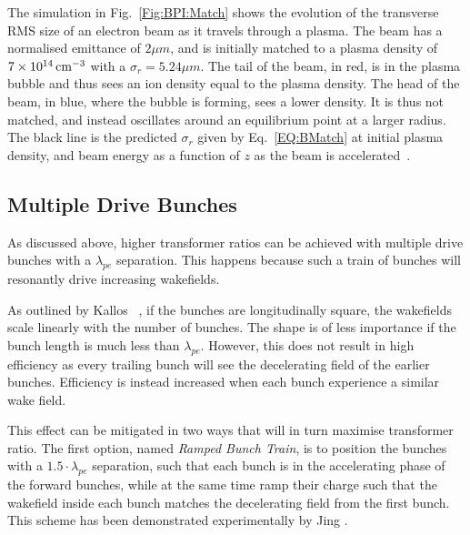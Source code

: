 The simulation in Fig.~\ref{Fig:BPI:Match} shows the evolution of the transverse RMS size of an electron beam as it travels through a plasma.
The beam has a normalised emittance of $2\unit{\mu m}$, and is initially matched to a plasma density of $7\times 10^{14}\,\mathrm{cm}^{-3}$ with a $\sigma_{r} = 5.24\unit{\mu m}$.
The tail of the beam, in red, is in the plasma bubble and thus sees an ion density equal to the plasma density.
The head of the beam, in blue, where the bubble is forming, sees a lower density.
It is thus not matched, and instead oscillates around an equilibrium point at a larger radius.
The black line is the predicted $\sigma_{r}$ given by Eq.~\ref{EQ:BMatch} at initial plasma density, and beam energy as a function of $z$ as the beam is accelerated~\cite{berglyd_olsen:2018}.

\subsection{Multiple Drive Bunches}
\label{Int:BPI:Multi}

As discussed above, higher transformer ratios can be achieved with multiple drive bunches with a $\lambda_{pe}$ separation.
This happens because such a train of bunches will resonantly drive increasing wakefields.

As outlined by Kallos \etal~\cite{kallos:2007}, if the bunches are longitudinally square, the wakefields scale linearly with the number of bunches.
The shape is of less importance if the bunch length is much less than $\lambda_{pe}$.
However, this does not result in high efficiency as every trailing bunch will see the decelerating field of the earlier bunches.
Efficiency is instead increased when each bunch experience a similar wake field.

This effect can be mitigated in two ways that will in turn maximise transformer ratio.
The first option, named \textit{Ramped Bunch Train}, is to position the bunches with a $1.5\cdot\lambda_{pe}$ separation, such that each bunch is in the accelerating phase of the forward bunches, while at the same time ramp their charge such that the wakefield inside each bunch matches the decelerating field from the first bunch.
This scheme has been demonstrated experimentally by Jing \etal \cite{jing:2006,jing:2007}.

